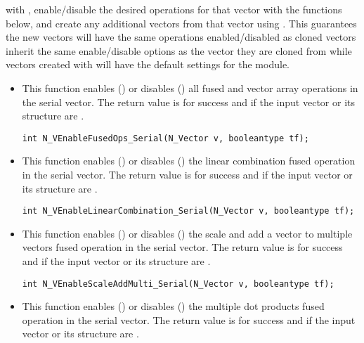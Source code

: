 with , enable/disable the desired operations for that vector
with the functions below, and create any additional vectors from that vector
using . This guarantees the new vectors will have the same
operations enabled/disabled as cloned vectors inherit the same enable/disable
options as the vector they are cloned from while vectors created with
 will have the default settings for the {\nvecs} module.
\begin{itemize}


\item {}

This function enables () or disables () all fused and
vector array operations in the serial vector. The return value is  for
success and  if the input vector or its  structure are .

\verb|int N_VEnableFusedOps_Serial(N_Vector v, booleantype tf);|


\item {}

This function enables () or disables () the linear
combination fused operation in the serial vector. The return value is  for
success and  if the input vector or its  structure are .

\verb|int N_VEnableLinearCombination_Serial(N_Vector v, booleantype tf);|


\item {}

This function enables () or disables () the scale and
add a vector to multiple vectors fused operation in the serial vector. The
return value is  for success and  if the input vector or its
 structure are .

\verb|int N_VEnableScaleAddMulti_Serial(N_Vector v, booleantype tf);|


\item {}

This function enables () or disables () the multiple
dot products fused operation in the serial vector. The return value is 
for success and  if the input vector or its  structure are
.


\end{itemize}
